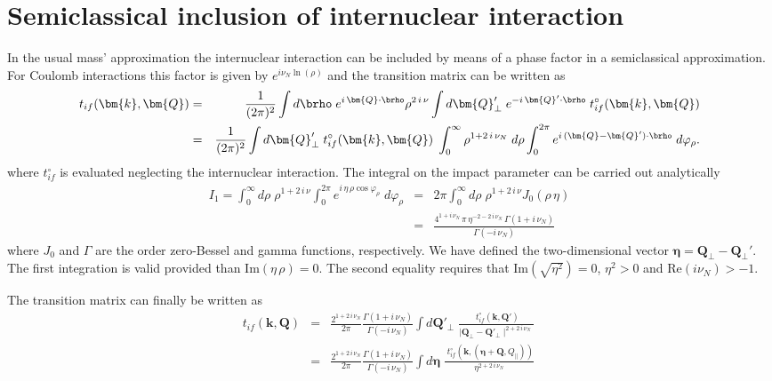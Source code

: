 \section{Semiclassical inclusion of internuclear interaction}

In the usual mass' approximation the internuclear interaction can be included
by means of a phase factor in a semiclassical approximation.  For Coulomb
interactions this factor is given by $e^{i \nu_{N}\ln(\rho)}$ and the
transition matrix can be written as
%
\begin{eqnarray}\label{Q:Npot-semic}
t_{if}(\bm{k},\bm{Q}) &=& \frac{1}{(2 \pi)^{2}} \int d \brho \; e^{i
\, \bm{Q} \cdot \brho } \rho^{2 \, i \, \nu} \int d \bm{Q}_{\perp}' \;
e^{- i \, \bm{Q}' \cdot \brho } \;
t^{\circ}_{if}(\bm{k},\bm{Q}) \nonumber \\
  &=&
\frac{1}{(2 \pi)^{2}} \int d \bm{Q}_{\perp}' \; t^{\circ}_{if}(\bm{k},\bm{Q})
\; \int_{0}^{\infty}  \rho^{ 1 + 2 \, i \, \nu_{N}} \; d \rho
\int_{0}^{2 \pi} e^{i \, (\bm{Q}- \bm{Q}') \cdot \brho} \; d
\varphi_{\rho}.
\end{eqnarray}
%
where $t^{\circ}_{if}$ is evaluated neglecting the internuclear interaction. The
integral on the impact parameter can be carried out analytically
\begin{eqnarray}\label{Q:Npot-semic1}
I_{1}=\int_{0}^{\infty} d \rho \; \rho^{ 1 + 2 \, i \, \nu}
\int_{0}^{2 \pi} e^{i \, \eta\, \rho \cos{\varphi_{\rho}}} \; d
\varphi_{\rho} &=& 2 \pi \int_{0}^{\infty} d \rho \; \rho^{1 + 2 \, i
\, \nu} J_{0}(\rho \,\eta)
  \\ &=&
\frac{{4^{1 + i\,\nu_{N}}}\,\pi \, \eta^{-2 - 2\, i\,\nu_{N}}\,
\Gamma(1 + i\,\nu_{N})} {\Gamma\left(- i\,\nu_{N} \right)} \nonumber
\end{eqnarray}
where $J_{0}$ and $\Gamma$ are the order zero-Bessel and gamma functions,
respectively. We have defined the two-dimensional vector
$\bm{\eta}=\bm{Q}_{\perp}-\bm{Q}_{\perp}'$. The first integration is valid
provided than $\textrm{Im}\left(\eta \, \rho \right)=0$. The second equality
requires that $\textrm{Im}\left(\sqrt{\eta^{2}} \right)=0$, $\eta^{2} > 0$
and $\textrm{Re}\left( i \nu_{N} \right) > -1$.

The transition matrix can finally be written as
\begin{eqnarray}\label{Q:tifNsemic}
t_{if}(\bm{k},\bm{Q}) &=& \frac{2^{1 + 2\,i\,\nu_{N}}}{2 \pi}
\frac{\Gamma(1 + i\,\nu_{N})} {\Gamma\left(- i\,\nu_{N} \right)} \int
d \bm{Q}'_{\perp} \; \frac{\; t^{\circ}_{if}(\bm{k},\bm{Q}')} {\mid
\bm{Q}_{\perp}-\bm{Q}'_{\perp}\mid ^{2 + 2\, i\,\nu_{N}}}\, \nonumber
\\
&=& \frac{2^{1 + 2\,i\,\nu_{N}}}{2 \pi} \frac{\Gamma(1 + i\,\nu_{N})}
{\Gamma\left(- i\,\nu_{N} \right)} \int d \bm{\eta} \; \frac{\;
t^{\circ}_{if}(\bm{k},(\bm{\eta}+\bm{Q},Q_{\parallel}))} {\eta^{2 + 2\,
i\,\nu_{N}}}\,
\end{eqnarray}

